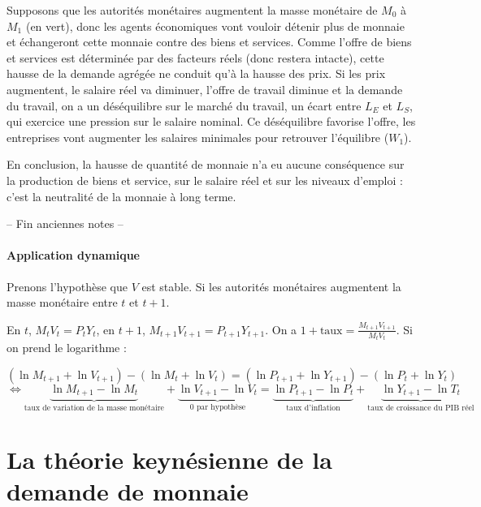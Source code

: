 	Supposons que les autorités monétaires augmentent la masse monétaire de $M_0$ à $M_1$ (en vert), donc les agents économiques vont vouloir détenir plus de monnaie et échangeront cette monnaie contre des biens et services. Comme l'offre de biens et services est déterminée par des facteurs réels (donc restera intacte), cette hausse de la demande agrégée ne conduit qu'à la hausse des prix. Si les prix augmentent, le salaire réel va diminuer, l'offre de travail diminue et la demande du travail, on a un déséquilibre sur le marché du travail, un écart entre $L_E$ et $L_S$, qui exercice une pression sur le salaire nominal. Ce déséquilibre favorise l'offre, les entreprises vont augmenter les salaires minimales pour retrouver l'équilibre ($W_1$).
	
	En conclusion, la hausse de quantité de monnaie n'a eu aucune conséquence sur la production de biens et service, sur le salaire réel et sur les niveaux d'emploi : c'est la neutralité de la monnaie à long terme.
	
	\bigbreak
	\begin{center}
	-- Fin anciennes notes --
	\end{center}
	
	\bigbreak
		
	\paragraph{Application dynamique}
	Prenons l'hypothèse que $V$ est stable. Si les autorités monétaires augmentent la masse monétaire entre $t$ et $t + 1$.
	
	En $t$, $M_t V_t = P_t Y_t$, en $t + 1$, $M_{t + 1} V_{t + 1} = P_{t + 1} Y_{t + 1}$. On a $1 + \text{taux} = \frac{M_{t + 1} V_{t + 1}}{M_t V_t}$. Si on prend le logarithme :
	
	$$(\ln M_{t + 1} + \ln V_{t + 1}) - (\ln M_t + \ln V_t) = (\ln P_{t + 1} + \ln Y_{t + 1}) - (\ln P_t + \ln Y_t)$$
	$$\Leftrightarrow \underbrace{\ln M_{t + 1} - \ln M_t}_{\text{taux de variation de la masse monétaire}} + \underbrace{\ln V_{t + 1} - \ln V_t}_{0\text{ par hypothèse}} = \underbrace{\ln P_{t + 1} -\ln P_t}_{\text{taux d'inflation}} + \underbrace{\ln Y_{t + 1} - \ln T_t}_{\text{taux de croissance du PIB réel}}$$


\section{La théorie keynésienne de la demande de monnaie}

